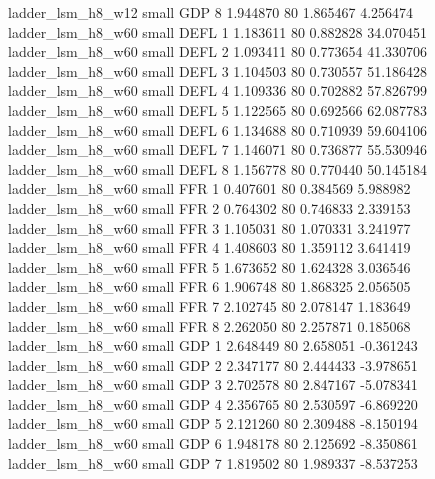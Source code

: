        ladder_lsm_h8_w12      small      GDP                 8 1.944870 80       1.865467           4.256474
       ladder_lsm_h8_w60      small     DEFL                 1 1.183611 80       0.882828          34.070451
       ladder_lsm_h8_w60      small     DEFL                 2 1.093411 80       0.773654          41.330706
       ladder_lsm_h8_w60      small     DEFL                 3 1.104503 80       0.730557          51.186428
       ladder_lsm_h8_w60      small     DEFL                 4 1.109336 80       0.702882          57.826799
       ladder_lsm_h8_w60      small     DEFL                 5 1.122565 80       0.692566          62.087783
       ladder_lsm_h8_w60      small     DEFL                 6 1.134688 80       0.710939          59.604106
       ladder_lsm_h8_w60      small     DEFL                 7 1.146071 80       0.736877          55.530946
       ladder_lsm_h8_w60      small     DEFL                 8 1.156778 80       0.770440          50.145184
       ladder_lsm_h8_w60      small      FFR                 1 0.407601 80       0.384569           5.988982
       ladder_lsm_h8_w60      small      FFR                 2 0.764302 80       0.746833           2.339153
       ladder_lsm_h8_w60      small      FFR                 3 1.105031 80       1.070331           3.241977
       ladder_lsm_h8_w60      small      FFR                 4 1.408603 80       1.359112           3.641419
       ladder_lsm_h8_w60      small      FFR                 5 1.673652 80       1.624328           3.036546
       ladder_lsm_h8_w60      small      FFR                 6 1.906748 80       1.868325           2.056505
       ladder_lsm_h8_w60      small      FFR                 7 2.102745 80       2.078147           1.183649
       ladder_lsm_h8_w60      small      FFR                 8 2.262050 80       2.257871           0.185068
       ladder_lsm_h8_w60      small      GDP                 1 2.648449 80       2.658051          -0.361243
       ladder_lsm_h8_w60      small      GDP                 2 2.347177 80       2.444433          -3.978651
       ladder_lsm_h8_w60      small      GDP                 3 2.702578 80       2.847167          -5.078341
       ladder_lsm_h8_w60      small      GDP                 4 2.356765 80       2.530597          -6.869220
       ladder_lsm_h8_w60      small      GDP                 5 2.121260 80       2.309488          -8.150194
       ladder_lsm_h8_w60      small      GDP                 6 1.948178 80       2.125692          -8.350861
       ladder_lsm_h8_w60      small      GDP                 7 1.819502 80       1.989337          -8.537253
